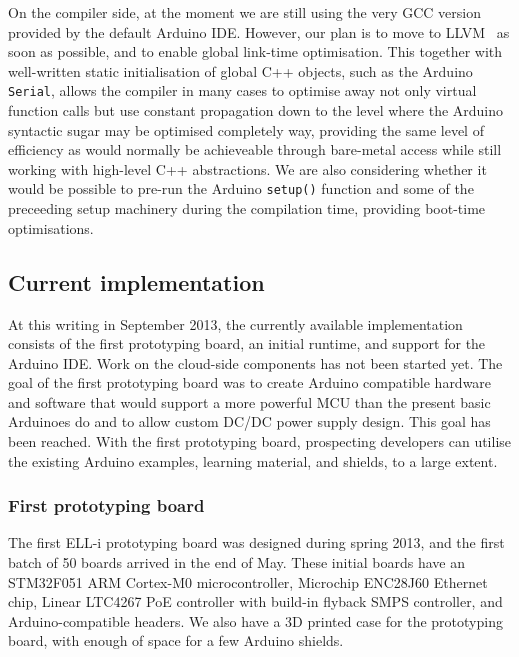 \documentclass[draft,a4paper]{siamltex}
\begin{document}
On the compiler side, at the moment we are still using the very GCC
version provided by the default Arduino IDE.  However, our plan is to
move to LLVM~\cite{LLVM} as soon as possible, and to enable global
link-time optimisation.  This together with well-written static
initialisation of global C++ objects, such as the Arduino \hbox{\tt
  Serial}, allows the compiler in many cases to optimise away not only
virtual function calls but use constant propagation down to the level
where the Arduino syntactic sugar may be optimised completely way,
providing the same level of efficiency as would normally be
achieveable through bare-metal access while still working with
high-level C++ abstractions.  We are also considering whether it would
be possible to pre-run the Arduino \hbox{\tt setup()} function and
some of the preceeding setup machinery during the compilation
time\cite{Rinta-aho_et_al}, providing boot-time optimisations.

\subsection{Current implementation}

At this writing in September 2013, the currently available
implementation consists of the first prototyping board, an initial
runtime, and support for the Arduino IDE.  Work on the cloud-side
components has not been started yet.
The goal of the first prototyping board was to create Arduino
compatible hardware and software that would support a more powerful
MCU than the present basic Arduinoes do and to allow custom DC/DC
power supply design.  This goal has been reached.  With the first
prototyping board, prospecting developers can utilise the existing
Arduino examples, learning material, and shields, to a large extent.

\subsubsection{First prototyping board}

The first ELL-i prototyping board was designed during spring 2013, and
the first batch of 50 boards arrived in the end of May.  These initial
boards have an STM32F051\cite{STM32F051} ARM Cortex-M0
microcontroller, Microchip ENC28J60\cite{ENC28J60} Ethernet chip,
Linear LTC4267 PoE controller with build-in flyback SMPS controller,
and Arduino-compatible headers.  We also have a 3D printed case for
the prototyping board, with enough of space for a few Arduino shields.
\end{document}
